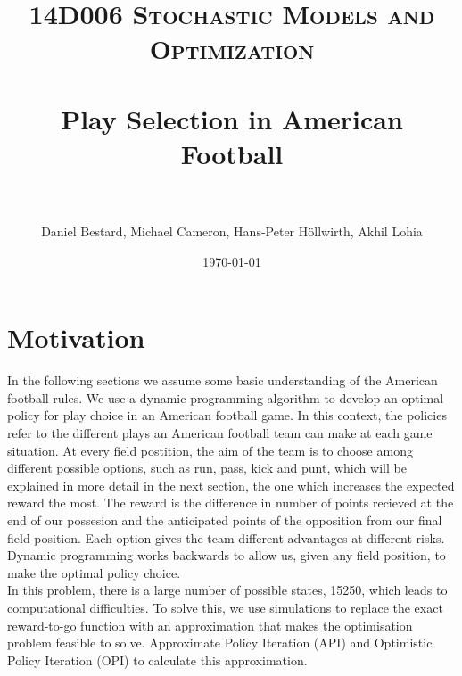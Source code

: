 \documentclass[11pt, oneside]{article}   	%
\title{
\normalfont \normalsize
\textsc{14D006 Stochastic Models and Optimization} \\ [25pt] %
\horrule{0.5pt} \\[0.4cm] %
\huge Play Selection in American Football\\ %
\horrule{2pt} \\[0.5cm] %
}
\author{Daniel Bestard, Michael Cameron, Hans-Peter H{\"o}llwirth, Akhil Lohia} %
\date{\normalsize\today} %
\begin{document}
\maketitle

\section{Motivation}
In the following sections we assume some basic understanding of the American football rules. We use a dynamic programming algorithm to develop an optimal policy for play choice in an American football game. In this context, the policies refer to the different plays an American football team can make at each game situation. At every field postition, the aim of the team is to choose among different possible options, such as run, pass, kick and punt, which will be explained in more detail in the next section, the one which increases the expected reward the most. The reward is the difference in  number of points recieved at the end of our possesion and the anticipated points of the opposition from our final field position. Each option gives the team different advantages at different risks. Dynamic programming works backwards to allow us, given any field position, to make the optimal policy choice. \\
In this problem, there is a large number of possible states, 15250, which leads to computational difficulties. To solve this, we use simulations to replace the exact reward-to-go function with an approximation that makes the optimisation problem feasible to solve. Approximate Policy Iteration (API) and Optimistic Policy Iteration (OPI) to calculate this approximation.


\end{document}

